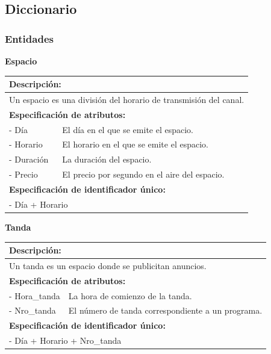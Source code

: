 \documentclass[a4paper,10pt]{article}
\begin{document}
  \subsection{Diccionario}
    \subsubsection{Entidades}
    \begin{flushleft}
      \begin{large} \bf{Espacio} \end{large}
    \end{flushleft}
      \begin{tabular}{| p{2cm} | p{9cm} |}
	\hline
	\multicolumn{2}{|l|}{\bf{Descripci\'on:}} \\
	\hline
	\multicolumn{2}{|l|}{Un espacio es una divisi\'on del horario de transmisi\'on del canal.} \\
	\hline	
	\multicolumn{2}{|l|}{\bf{Especificaci\'on de atributos:}} \\
	\hline
	- D\'ia & El d\'ia en el que se emite el espacio. \\
	\hline \hline
	- Horario & El horario en el que se emite el espacio. \\
	\hline \hline
	- Duraci\'on & La duraci\'on del espacio.\\
	\hline \hline
	- Precio & El precio por segundo en el aire del espacio.\\
	\hline
	\multicolumn{2}{|l|}{\bf{Especificaci\'on de identificador \'unico:}} \\
	\hline
	\multicolumn{2}{|l|}{- D\'ia + Horario} \\
	\hline
      \end{tabular}
    
    \begin{flushleft}
      \begin{large} \bf{Tanda} \end{large}
    \end{flushleft}
      \begin{tabular}{| p{2cm} | p{9cm} |}
	\hline
	\multicolumn{2}{|l|}{\bf{Descripci\'on:}} \\
	\hline
	\multicolumn{2}{|l|}{Un tanda es un espacio donde se publicitan anuncios.} \\
	\hline	
	\multicolumn{2}{|l|}{\bf{Especificaci\'on de atributos:}} \\
	\hline
	- Hora\_tanda & La hora de comienzo de la tanda. \\
	\hline \hline
	- Nro\_tanda & El n\'umero de tanda correspondiente a un programa. \\
	\hline
	\multicolumn{2}{|l|}{\bf{Especificaci\'on de identificador \'unico:}} \\
	\hline
	\multicolumn{2}{|l|}{- D\'ia + Horario + Nro\_tanda} \\
	\hline
      \end{tabular}
\end{document}
